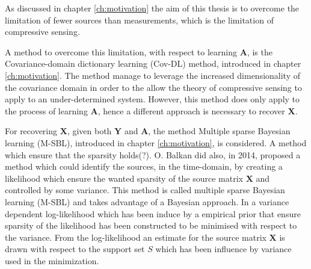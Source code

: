 As discussed in chapter \ref{ch:motivation} the aim of this thesis is to overcome the limitation of fewer sources than measurements, which is the limitation of compressive sensing.  

A method to overcome this limitation, with respect to learning $\textbf{A}$, is the Covariance-domain dictionary learning (Cov-DL) method\cite{Balkan2015}, introduced in chapter \ref{ch:motivation}. The method manage to leverage the increased dimensionality of the covariance domain in order to the allow the theory of compressive sensing to apply to an under-determined system.     
However, this method does only apply to the process of learning $\textbf{A}$, hence a different approach is necessary to recover $\textbf{X}$.

For recovering $\mathbf{X}$, given both $\textbf{Y}$ and $\textbf{A}$, the method Multiple sparse Bayesian learning (M-SBL), introduced in chapter \ref{ch:motivation}, is considered.
A method which ensure that the sparsity holds(?).
O. Balkan \cite{Balkan2014} did also, in 2014, proposed a method which could identify the sources, in the time-domain, by creating a likelihood which ensure the wanted sparsity of the source matrix $\mathbf{X}$ and controlled by some variance. This method is called multiple sparse Bayesian learning (M-SBL) and takes advantage of a Bayesian approach. 
In \cite{Balkan2014} a variance dependent log-likelihood which has been induce by a empirical prior that ensure sparsity of the likelihood has been constructed to be minimised with respect to the variance. 
From the log-likelihood an estimate for the source matrix $\mathbf{X}$ is drawn with respect to the support set $S$ which has been influence by variance used in the minimization.





